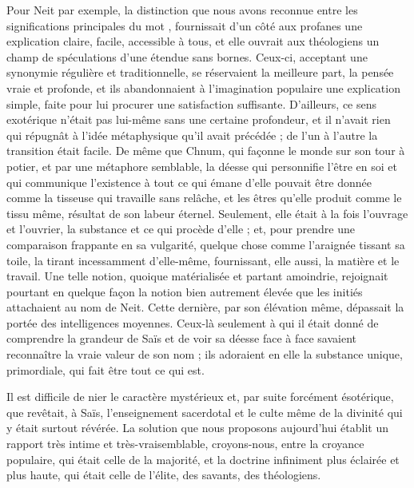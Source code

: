 \documentclass[a4paper, 11pt, oneside]{article}
\newcommand*\hieroAAAQ{}
\begin{document}
Pour Neit par exemple, la distinction que nous avons reconnue entre les significations principales du mot $\hieroAAAQ$, fournissait d'un côté aux profanes une explication claire, facile, accessible à tous, et elle ouvrait aux théologiens un champ de spéculations d'une étendue sans bornes. Ceux-ci, acceptant une synonymie régulière et traditionnelle, se réservaient la meilleure part, la pensée vraie et profonde, et ils abandonnaient à l'imagination populaire une explication simple, faite pour lui procurer une satisfaction suffisante. D'ailleurs, ce sens exotérique n'était pas lui-même sans une certaine profondeur, et il n'avait rien qui répugnât à l'idée métaphysique qu'il avait précédée ; de l'un à l'autre la transition était facile. De même que Chnum, qui façonne le monde sur son tour à potier, et par une métaphore semblable, la déesse qui personnifie l'être en soi et qui communique l'existence à tout ce qui émane d'elle pouvait être donnée comme la tisseuse qui travaille sans relâche, et les êtres qu'elle produit comme le tissu même, résultat de son labeur éternel. Seulement, elle était à la fois l'ouvrage et l'ouvrier, la substance et ce qui procède d'elle ; et, pour prendre une comparaison frappante en sa vulgarité, quelque chose comme l'araignée tissant sa toile, la tirant incessamment d'elle-même, fournissant, elle aussi, la matière et le travail. Une telle notion, quoique matérialisée et partant amoindrie, rejoignait pourtant en quelque façon la notion bien autrement élevée que les initiés attachaient au nom de Neit. Cette dernière, par son élévation même, dépassait la portée des intelligences moyennes. Ceux-là seulement à qui il était donné de comprendre la grandeur de Saïs et de voir sa déesse face à face savaient reconnaître la vraie valeur de son nom ; ils adoraient en elle la substance unique, primordiale, qui fait être tout ce qui est.

Il est difficile de nier le caractère mystérieux et, par suite forcément ésotérique, que revêtait, à Saïs, l'enseignement sacerdotal et le culte même de la divinité qui y était surtout révérée. La solution que nous proposons aujourd'hui établit un rapport très intime et très-vraisemblable, croyons-nous, entre la croyance populaire, qui était celle de la majorité, et la doctrine infiniment plus éclairée et plus haute, qui était celle de l'élite, des savants, des théologiens.
\end{document}

